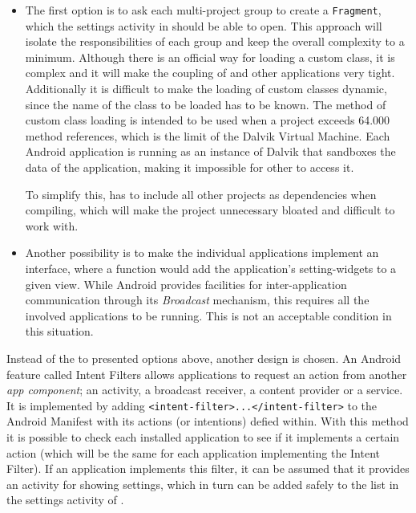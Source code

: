 \begin{itemize}
\item 
The first option is to ask each multi-project group to create a \lstinline|Fragment|, which the settings activity in \launcher should be able to open.
This approach will isolate the responsibilities of each group and keep the overall complexity to a minimum.
Although there is an official way for loading a custom class\cite{customClassLoading}, it is complex and it will make the coupling of \launcher and other applications very tight.
Additionally it is difficult to make the loading of custom classes dynamic, since the name of the class to be loaded has to be known.
The method of custom class loading is intended to be used when a project exceeds 64.000 method references, which is the limit of the Dalvik Virtual Machine.
Each Android application is running as an instance of Dalvik that sandboxes the data of the application, making it impossible for other to access it.

To simplify this, \launcher has to include all other projects as dependencies when compiling, which will make the \launcher project unnecessary bloated and difficult to work with.

\item
Another possibility is to make the individual applications implement an interface, where a function would add the application's setting-widgets to a given view.
While Android provides facilities for inter-application communication through its \textit{Broadcast} mechanism\cite{broadcastReceiver}, this requires all the involved applications to be running.
This is not an acceptable condition in this situation. 
\end{itemize}
 
Instead of the to presented options above, another design is chosen.
An Android feature called Intent Filters allows applications to request an action from another \textit{app component}; an activity, a broadcast receiver, a content provider or a service.
It is implemented by adding \lstinline|<intent-filter>...</intent-filter>| to the Android Manifest with its actions (or intentions) defied within.\cite{intentFilter}
With this method it is possible to check each installed application to see if it implements a certain action (which will be the same for each \giraf application implementing the Intent Filter).
If an application implements this filter, it can be assumed that it provides an activity for showing settings, which in turn can be added safely to the list in the settings activity of \launcher.


